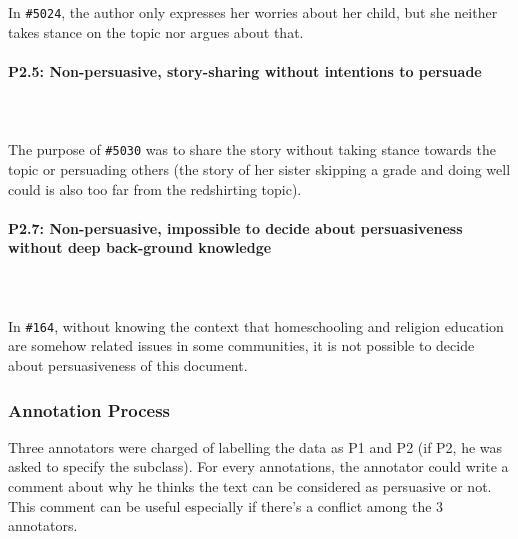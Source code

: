 \\
\\
In \texttt{\#5024}, the author only expresses her worries about her child, but she neither takes stance on the topic nor argues about that.
\\
\\
\textbf{P2.5: Non-persuasive, story-sharing without intentions to persuade}
\\
\\
\\
\\
The purpose of \texttt{\#5030} was to share the story without taking stance towards the topic or persuading others (the story of her sister skipping a grade and doing well could is also too far from the redshirting topic).
\\
\\
\textbf{P2.7: Non-persuasive, impossible to decide about persuasiveness without deep back-ground knowledge}
\\
\\
\\
\\
In \texttt{\#164}, without knowing the context that homeschooling and religion education are somehow related issues in some communities, it is not possible to decide about persuasiveness of this document.

\subsubsection{Annotation Process}
Three annotators were charged of labelling the data as P1 and P2 (if P2, he was asked to specify the subclass). For every annotations, the annotator could write a comment about why he thinks the text can be considered as persuasive or not. This comment can be useful especially if there's a conflict among the 3 annotators. 

